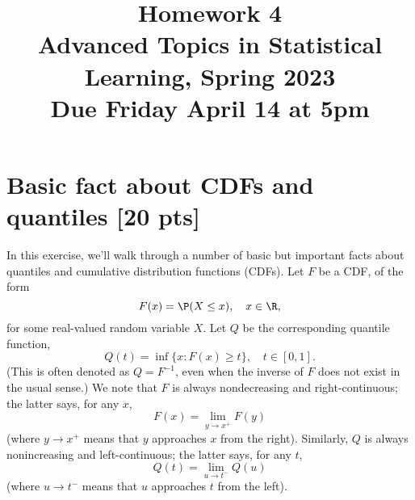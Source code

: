 \documentclass{article}
\title{Homework 4 \\ \smallskip
\large Advanced Topics in Statistical Learning, Spring 2023 \\ \smallskip
Due Friday April 14 at 5pm}
\date{}
\begin{document}
\maketitle
\RaggedRight
\vspace{-50pt}

\section{Basic fact about CDFs and quantiles [20 pts]}

In this exercise, we'll walk through a number of basic but important facts about 
quantiles and cumulative distribution functions (CDFs). Let $F$ be a CDF, of the
form 
\[
F(x) = \P(X \leq x), \quad x \in \R,
\]
for some real-valued random variable $X$. Let $Q$ be the corresponding quantile 
function,
\[
Q(t) = \inf \{ x : F(x) \geq t \}, \quad t \in [0,1].
\]
(This is often denoted as $Q = F^{-1}$, even when the inverse of $F$ does not
exist in the usual sense.) We note that $F$ is always nondecreasing and 
right-continuous; the latter says, for any $x$,    
\[
F(x) = \lim_{y \to x^+} F(y)
\]
(where $y \to x^+$ means that $y$ approaches $x$ from the right).
Similarly, $Q$ is always nonincreasing and left-continuous; the latter says,
for any $t$,  
\[
Q(t) = \lim_{u \to t^-} Q(u)
\]
(where $u \to t^-$ means that $u$ approaches $t$ from the left).
\end{document}
